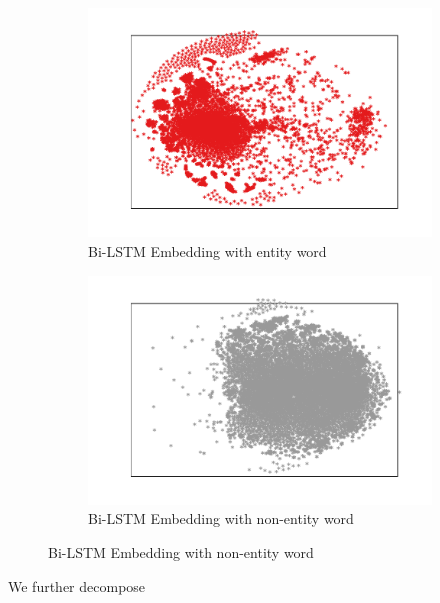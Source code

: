 \documentclass{article}
\begin{document}
\begin{figure}[t]
	\centering
	\begin{subfigure}{0.5\textwidth}
		\includegraphics[width=\linewidth]{bi_lstm_gold_positive.pdf}
		\caption{Bi-LSTM Embedding with entity word}
		\label{fig:bi_lstm_gold_positive}
	\end{subfigure}\hfil 
	\begin{subfigure}{0.5\textwidth}
		\includegraphics[width=\linewidth]{bi_lstm_gold_negative.pdf}
		\caption{Bi-LSTM Embedding with non-entity word}
		\label{fig:bi_lstm_gold_negative}
	\end{subfigure}
\end{figure}

We further decompose 


\end{document}
